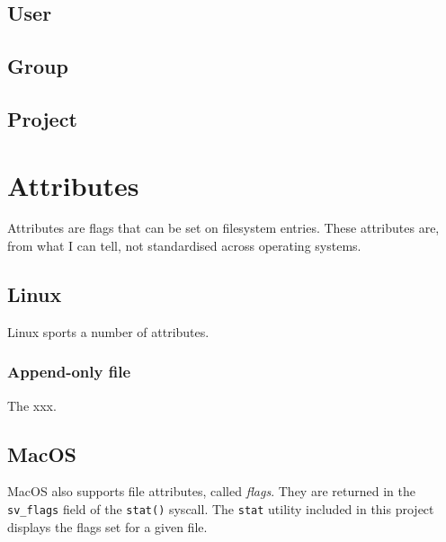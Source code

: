 \documentclass[a4paper]{article}
\begin{document}
\subsection{User}

\subsection{Group}

\subsection{Project}


\section{Attributes}

Attributes are flags that can be set on filesystem entries. These attributes are, from what I can tell, not standardised across operating systems. 

\subsection{Linux}

Linux sports a number of attributes.


\subsubsection{Append-only file}

The xxx.

\subsection{MacOS}



MacOS also supports file attributes, called \emph{flags}. They are returned in the \verb|sv_flags| field of the \verb|stat()| syscall. The \verb|stat| utility included in this project displays the flags set for a given file.
\end{document}
